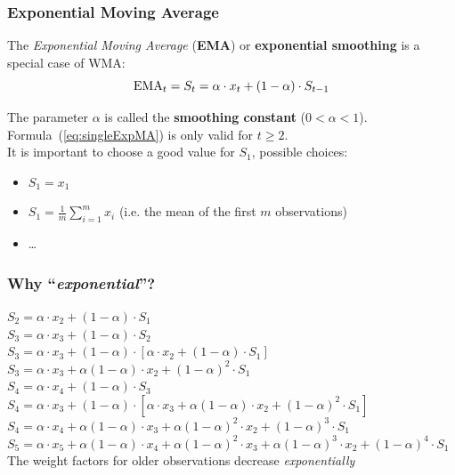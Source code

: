 \documentclass{beamer}
\begin{document}
\begin{frame}
  \frametitle{Exponential Moving Average}
The \emph{Exponential Moving Average} (\textbf{EMA}) or \textbf{exponential smoothing} is a special case of WMA:
\begin{equation}
\textnormal{EMA}_t = S_t = \alpha \cdot x_t + (1-\alpha) \cdot S_{t-1}
\label{eq:singleExpMA}
\end{equation}

The parameter $\alpha$ is called the \textbf{smoothing constant} ($0 < \alpha < 1$). 
\vfill
Formula~(\ref{eq:singleExpMA}) is only valid for $t \geq 2$.\\
It is important to choose a good value for $S_1$, possible choices:
  
  \begin{itemize}
    \item $S_1 = x_1$
    \item $S_1 = \frac{1}{m} \sum_{i=1}^{m} x_i$ (i.e. the mean of the first $m$ observations)
    \item \ldots
  \end{itemize}
\end{frame}

\begin{frame}
  \frametitle{Why ``\emph{exponential}''?}

$ S_2 = \alpha \cdot x_2 + (1-\alpha) \cdot S_1 $\\
\vfill
$ S_3 = \alpha \cdot x_3 + (1-\alpha) \cdot S_2 $\\
$ S_3 = \alpha \cdot x_3 + (1-\alpha) \cdot \left[\alpha \cdot x_2 + (1-\alpha) \cdot S_1\right]  $\\
$ S_3 = \alpha \cdot x_3 + \alpha (1-\alpha) \cdot x_2 + (1-\alpha)^2 \cdot S_1  $\\
\vfill
$ S_4 = \alpha \cdot x_4 + (1-\alpha) \cdot S_3 $\\
$ S_4 = \alpha \cdot x_3 + (1-\alpha) \cdot \left[ \alpha \cdot x_3 + \alpha (1-\alpha) \cdot x_2 + (1-\alpha)^2 \cdot S_1\right]  $\\
$ S_4 = \alpha \cdot x_4 + \alpha (1-\alpha) \cdot x_3 + \alpha (1-\alpha)^2 \cdot x_2 + (1-\alpha)^3 \cdot S_1  $\\
\vfill
$ S_5 = \alpha \cdot x_5 + \alpha (1-\alpha) \cdot x_4 + \alpha (1-\alpha)^2 \cdot x_3 + \alpha (1-\alpha)^3 \cdot x_2 + (1-\alpha)^4 \cdot S_1  $\\
\vfill
The weight factors for older observations decrease \textit{exponentially}
\end{frame}
\end{document}
